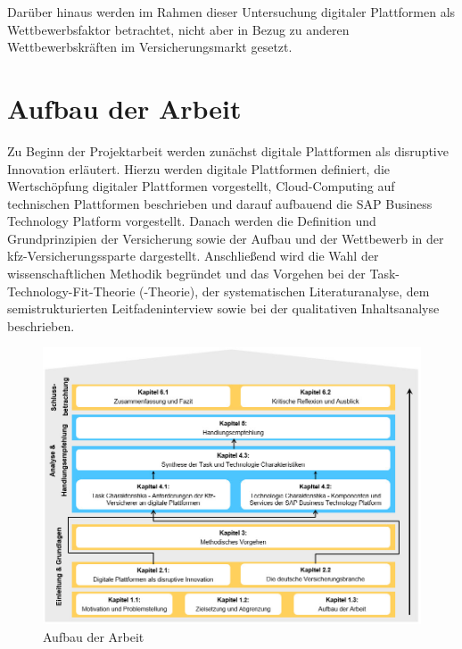 Darüber hinaus werden im Rahmen dieser Untersuchung digitaler Plattformen als Wettbewerbsfaktor betrachtet, nicht aber in Bezug zu anderen Wettbewerbskräften im Versicherungsmarkt gesetzt.




\section{Aufbau der Arbeit}

Zu Beginn der Projektarbeit werden zunächst digitale Plattformen als disruptive Innovation erläutert. Hierzu werden digitale Plattformen definiert, die Wertschöpfung digitaler Plattformen vorgestellt, Cloud-Computing auf technischen Plattformen beschrieben und darauf aufbauend die SAP Business Technology Platform vorgestellt. Danach werden die Definition und Grundprinzipien der Versicherung sowie der Aufbau und der Wettbewerb in der \ac{kfz}-Versicherungssparte dargestellt. Anschließend wird die Wahl der wissenschaftlichen Methodik begründet und das Vorgehen bei der Task-Technology-Fit-Theorie (-Theorie), der systematischen Literaturanalyse, dem semistrukturierten Leitfadeninterview sowie bei der qualitativen Inhaltsanalyse beschrieben. \newpage

\begin{figure}[h]
    \centering
    \includegraphics[width=1\textwidth]{img/Aufbau_der_Arbeit2.jpg}
    \caption[Aufbau der Arbeit]{Aufbau der Arbeit\autocite{Aufbau}}
    \label{fig:Aufbau}
\end{figure}

